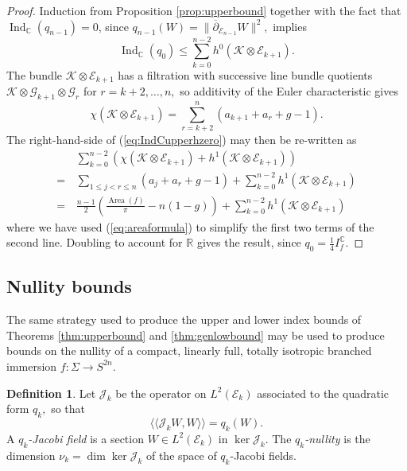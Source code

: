 \documentclass[11pt]{article}
\theoremstyle{definition}
\newtheorem{definition}[theorem]{Definition}
\newcommand{\R}{\mathbb{R}}
\newcommand{\C}{\mathbb{C}}
\newcommand{\delbar}{\overline{\partial}}
\newcommand{\llangle}{\langle\!\langle}
\newcommand{\rrangle}{\rangle\!\rangle}
\numberwithin{equation}{section}
\begin{document}
\begin{proof}
	Induction from Proposition \ref{prop:upperbound} together with the fact that $\operatorname{Ind}_\C(q_{n-1}) = 0$, since $q_{n-1}(W) = \lVert \delbar_{\mathcal{E}_{n-1}} W \rVert^2,$ implies
	\begin{equation}\label{eq:IndCupperhzero}
		\operatorname{Ind}_\C(q_0) \leq \sum_{k=0}^{n-2} h^0(\mathcal{K} \otimes \mathcal{E}_{k+1}).
	\end{equation}
	The bundle $\mathcal{K} \otimes \mathcal{E}_{k+1}$ has a filtration with successive line bundle quotients $\mathcal{K} \otimes \mathcal{G}_{k+1} \otimes \mathcal{G}_r$ for $r = k+2, \ldots, n,$ so additivity of the Euler characteristic gives
	\begin{equation*}
		\chi(\mathcal{K} \otimes \mathcal{E}_{k+1}) = \sum_{r=k+2}^n(a_{k+1} + a_r + g - 1).
	\end{equation*}
	The right-hand-side of (\ref{eq:IndCupperhzero}) may then be re-written as
	\begin{equation*}
		\begin{aligned}
			    & \sum_{k=0}^{n-2} \left( \chi(\mathcal{K} \otimes \mathcal{E}_{k+1}) + h^1(\mathcal{K} \otimes \mathcal{E}_{k+1}) \right)              \\
			=\, & \sum_{1 \leq j < r \leq n}(a_j+a_r+g-1) + \sum_{k=0}^{n-2} h^1(\mathcal{K} \otimes \mathcal{E}_{k+1})                                 \\
			=\, & \frac{n-1}{2} \left( \frac{\operatorname{Area}(f)}{\pi} - n(1-g) \right) + \sum_{k=0}^{n-2} h^1(\mathcal{K} \otimes \mathcal{E}_{k+1}) 
		\end{aligned}
	\end{equation*}
	where we have used (\ref{eq:areaformula}) to simplify the first two terms of the second line. Doubling to account for $\R$ gives the result, since $q_0 = \tfrac{1}{4} I^\C_f.$ 
\end{proof}

\subsection{Nullity bounds}

\indent \indent The same strategy used to produce the upper and lower index bounds of Theorems \ref{thm:upperbound} and \ref{thm:genlowbound} may be used to produce bounds on the nullity of a compact, linearly full, totally isotropic branched immersion $f: \Sigma \to S^{2n}.$

\begin{definition}
    Let $\mathcal{J}_k$ be the operator on $L^2(\mathcal{E}_k)$ associated to the quadratic form $q_k,$ so that
    \begin{equation*}
        \llangle \mathcal{J}_k W, W \rrangle = q_k(W).
    \end{equation*}
    A \emph{$q_k$-Jacobi field} is a section $W \in L^2(\mathcal{E}_k)$ in $\ker \mathcal{J}_k.$ The \emph{$q_k$-nullity} is the dimension $\nu_k = \dim \ker \mathcal{J}_k$ of the space of $q_k$-Jacobi fields.
\end{definition}
\end{document}

